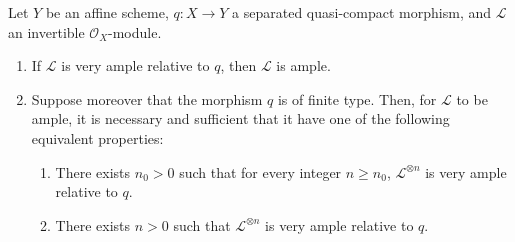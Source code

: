 \begin{proposition}[4.5.10]
\label{II.4.5.10}
Let $Y$ be an affine scheme, $q:X\to Y$ a separated quasi-compact morphism,
and $\mathcal{L}$ an invertible $\mathcal{O}_X$-module.
\begin{enumerate}
  \item[\rm{(i)}] If $\mathcal{L}$ is very ample relative to $q$, then
  $\mathcal{L}$ is ample.
  \item[\rm{(ii)}] Suppose moreover that the morphism $q$ is \textup{of finite type}.
  Then, for $\mathcal{L}$ to be ample, it is necessary and sufficient that it have
  one of the following equivalent properties:
  \begin{enumerate}
    \item[\rm{e)}] There exists $n_0>0$ such that for every integer $n\geq n_0$,
    $\mathcal{L}^{\otimes n}$ is very ample relative to $q$.
    \item[\rm{e')}] There exists $n>0$ such that $\mathcal{L}^{\otimes n}$ is
    very ample relative to $q$.
  \end{enumerate}
\end{enumerate}
\end{proposition}

